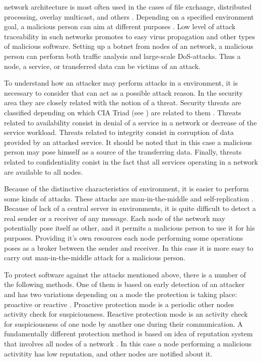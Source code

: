 %
 network architecture is most often used in the cases of file exchange, distributed processing, overlay multicast, and others . 
%
Depending on a specified  environment goal, a malicious person can aim at different purposes  . 
%
Low level of attack traceability in such networks promotes to easy virus propagation and other types of malicious software. 
%
Setting up a botnet from nodes of an  network, a malicious person can perform both traffic analysis and large-scale DoS-attacks. 
%
Thus a node, a service, or transferred data can be victims of an attack. 

%
To understand how an attacker may perform attacks in a  environment, it is necessary to consider that can act as a possible attack reason. 
%
In the security area they are closely related with the notion of a threat. 
%
Security threats are classified depending on which CIA Triad (see ) are related to them   . 
%
Threats related to availability consist in denial of a service in a network or decrease of the service workload. 
%
Threats related to integrity consist in corruption of data provided by an attacked service. 
%
It should be noted that in this case a malicious person may pose himself as a source of the transferring data. 
%
Finally, threats related to confidentiality conist in the fact that all services operating in a network are available to all nodes. 

%
Because of the distinctive characteristics of  environment, it is easier to perform some kinds of attacks. 
%
These attacks are man-in-the-middle and self-replication . 
%
Because of lack of a central server in  environments, it is quite difficult to detect a real sender or a receiver of any message. 
%
Each node of the network may potentially pose itself as other, and it permits a malicious person to use it for his purposes. 
%
Providing it's own resources each node performing some operations poses as a broker between the sender and receiver. 
%
In this case it is more easy to carry out man-in-the-middle attack for a malicious person. 

%
To protect software against the attacks mentioned above, there is a number of the following methods. 
%
One of them is based on early detection of an attacker and has two variations depending on a mode the protection is taking place: proactive or reactive . 
%
Proactive protection mode is a periodic other nodes activity check for suspiciousness. 
%
Reactive protection mode is an activity check for suspiciousness of one node by another one during their communication. 
%
A fundamentally different protection method is based on idea of reputation system that involves all nodes of a  network  . 
%
In this case a node performing a malicious activitity has low reputation, and other nodes are notified about it. 


